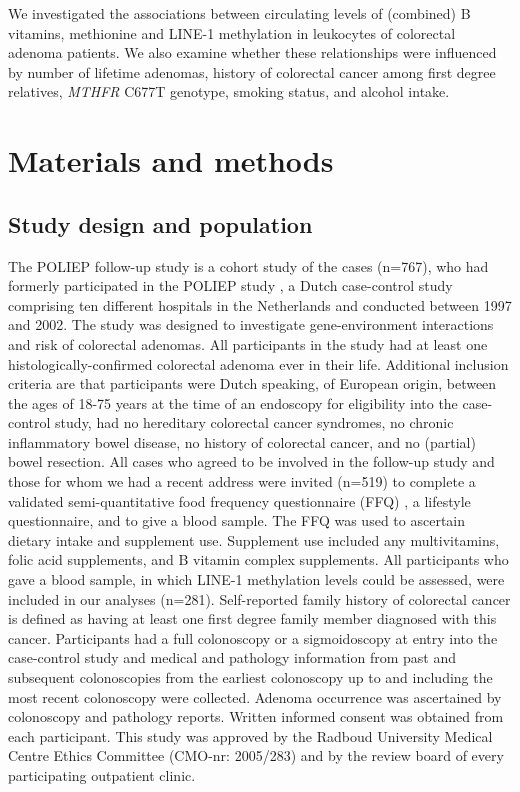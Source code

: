 \noindent We investigated the associations between circulating levels of (combined) B vitamins, methionine and LINE-1 methylation in leukocytes of colorectal adenoma patients. We also examine whether these relationships were influenced by number of lifetime adenomas, history of colorectal cancer among first degree relatives, \emph{MTHFR} C677T genotype, smoking status, and alcohol intake.

\section{Materials and methods} %
\subsection{Study design and population} %
\noindent The POLIEP follow-up study is a cohort study of the cases (n=767), who had formerly participated in the POLIEP study \cite{c543}, a Dutch case-control study comprising ten different hospitals in the Netherlands and conducted between 1997 and 2002. The study was designed to investigate gene-environment interactions and risk of colorectal adenomas. All participants in the study had at least one histologically-confirmed colorectal adenoma ever in their life. Additional inclusion criteria are that participants were Dutch speaking, of European origin, between the ages of 18-75 years at the time of an endoscopy for eligibility into the case-control study, had no hereditary colorectal cancer syndromes, no chronic inflammatory bowel disease, no history of colorectal cancer, and no (partial) bowel resection. All cases who agreed to be involved in the follow-up study and those for whom we had a recent address were invited (n=519) to complete a validated semi-quantitative food frequency questionnaire (FFQ) \cite{c544}, a lifestyle questionnaire, and to give a blood sample. The FFQ was used to ascertain dietary intake and supplement use. Supplement use included any multivitamins, folic acid supplements, and B vitamin complex supplements. All participants who gave a blood sample, in which LINE-1 methylation levels could be assessed, were included in our analyses (n=281). Self-reported family history of colorectal cancer is defined as having at least one first degree family member diagnosed with this cancer. Participants had a full colonoscopy or a sigmoidoscopy at entry into the case-control study and medical and pathology information from past and subsequent colonoscopies from the earliest colonoscopy up to and including the most recent colonoscopy were collected. Adenoma occurrence was ascertained by colonoscopy and pathology reports. Written informed consent was obtained from each participant. This study was approved by the Radboud University Medical Centre Ethics Committee (CMO-nr: 2005/283) and by the review board of every participating outpatient clinic.

